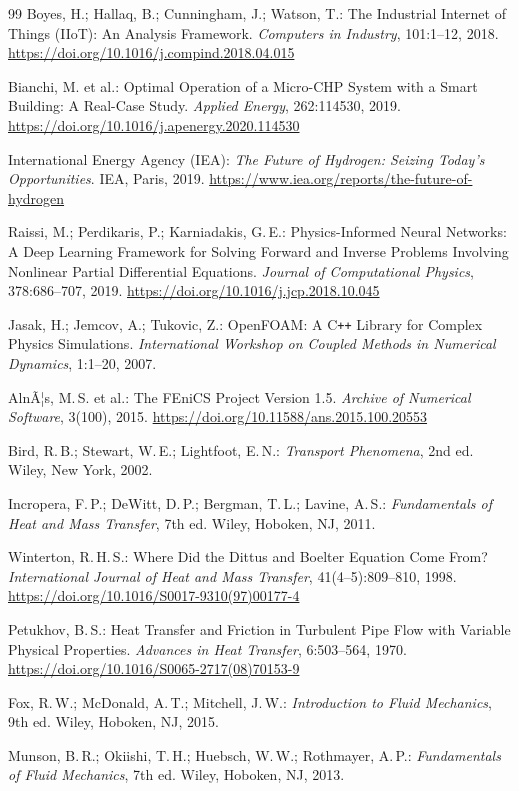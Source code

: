 ﻿\documentclass[12pt,a4paper,twoside]{article}
\theoremstyle{plain}
\theoremstyle{definition}
\theoremstyle{remark}
\begin{document}
\begin{thebibliography}{99}
Boyes, H.; Hallaq, B.; Cunningham, J.; Watson, T.:
The Industrial Internet of Things (IIoT): An Analysis Framework.
\textit{Computers in Industry}, 101:1--12, 2018.
\url{https://doi.org/10.1016/j.compind.2018.04.015}

Bianchi, M. et al.:
Optimal Operation of a Micro-CHP System with a Smart Building: A Real-Case Study.
\textit{Applied Energy}, 262:114530, 2019.
\url{https://doi.org/10.1016/j.apenergy.2020.114530}

International Energy Agency (IEA):
\textit{The Future of Hydrogen: Seizing Today's Opportunities}.
IEA, Paris, 2019.
\url{https://www.iea.org/reports/the-future-of-hydrogen}

Raissi, M.; Perdikaris, P.; Karniadakis, G.\,E.:
Physics-Informed Neural Networks: A Deep Learning Framework for Solving
Forward and Inverse Problems Involving Nonlinear Partial Differential Equations.
\textit{Journal of Computational Physics}, 378:686--707, 2019.
\url{https://doi.org/10.1016/j.jcp.2018.10.045}

Jasak, H.; Jemcov, A.; Tukovic, Z.:
OpenFOAM: A C\texttt{++} Library for Complex Physics Simulations.
\textit{International Workshop on Coupled Methods in Numerical Dynamics}, 1:1--20, 2007.

AlnÃ¦s, M.\,S. et al.:
The FEniCS Project Version 1.5.
\textit{Archive of Numerical Software}, 3(100), 2015.
\url{https://doi.org/10.11588/ans.2015.100.20553}

Bird, R.\,B.; Stewart, W.\,E.; Lightfoot, E.\,N.:
\textit{Transport Phenomena}, 2nd ed.
Wiley, New York, 2002.

Incropera, F.\,P.; DeWitt, D.\,P.; Bergman, T.\,L.; Lavine, A.\,S.:
\textit{Fundamentals of Heat and Mass Transfer}, 7th ed.
Wiley, Hoboken, NJ, 2011.

Winterton, R.\,H.\,S.:
Where Did the Dittus and Boelter Equation Come From?
\textit{International Journal of Heat and Mass Transfer}, 41(4--5):809--810, 1998.
\url{https://doi.org/10.1016/S0017-9310(97)00177-4}

Petukhov, B.\,S.:
Heat Transfer and Friction in Turbulent Pipe Flow with Variable Physical Properties.
\textit{Advances in Heat Transfer}, 6:503--564, 1970.
\url{https://doi.org/10.1016/S0065-2717(08)70153-9}

Fox, R.\,W.; McDonald, A.\,T.; Mitchell, J.\,W.:
\textit{Introduction to Fluid Mechanics}, 9th ed.
Wiley, Hoboken, NJ, 2015.

Munson, B.\,R.; Okiishi, T.\,H.; Huebsch, W.\,W.; Rothmayer, A.\,P.:
\textit{Fundamentals of Fluid Mechanics}, 7th ed.
Wiley, Hoboken, NJ, 2013.

\end{thebibliography}
\end{document}
